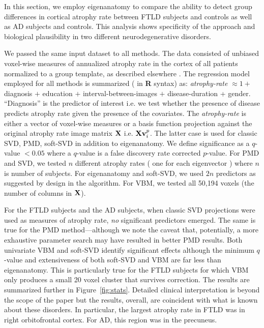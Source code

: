 \documentclass{llncs}
\newcommand{\X}{{\bf X}}
\newcommand{\vv}{{\bf v}}
\begin{document}
  In this section, we employ eigenanatomy to compare the ability to detect group differences in cortical atrophy rate between FTLD subjects and controls as well as AD subjects and controls.  This analysis shows specificity of the approach and biological plausibility in two different neurodegenerative disorders.  

We passed the same input dataset to all methods.  The data consisted of unbiased voxel-wise measures of annualized atrophy rate in the cortex of all patients normalized to a group template, as described elsewhere \cite{anon}.  The regression model employed for all methods is summarized ( in {\bf R} syntax) as: {\em atrophy-rate} $\approx 1 +$ diagnosis $+$ education $+$ interval-between-images $+$ disease-duration + gender.  ``Diagnosis'' is the predictor of interest i.e. we test whether the presence of disease predicts atrophy rate given the presence of the covariates.  The {\em atrophy-rate} is either a vector of voxel-wise measures or a basis function projection against the original atrophy rate image matrix $\X$ i.e. $\X \vv_i^p$.   The latter case is used for classic SVD, PMD, soft-SVD in addition to eigenanatomy.  We define significance as a $q$-value $< 0.05$ where a $q$-value is a false discovery rate corrected $p$-value.  For PMD and SVD, we tested $n$ different atrophy rates ( one for each eigenvector ) where $n$ is number of subjects.  For eigenanatomy and soft-SVD, we used $2n$ predictors as suggested by design in the algorithm.  For VBM, we tested all 50,194 voxels (the number of columns in $\X$).

For the FTLD subjects and the AD subjects, when classic SVD projections were used as measures of atrophy rate, {\em no} significant predictors emerged.  The same is true for the PMD method---although we note the caveat that, potentially, a more exhaustive parameter search may have resulted in better PMD results.  Both univariate VBM and soft-SVD identify significant effects although the minimum $q$-value and extensiveness of both soft-SVD and VBM are far less than eigenanatomy.  This is particularly true for the FTLD subjects for which VBM only produces a small 20 voxel cluster that survives correction.  The results are summarized further in Figure~\ref{fig:stats}.  Detailed clinical interpretation is beyond the scope of the paper but the results, overall, are coincident with what is known about these disorders.  In particular, the largest atrophy rate in FTLD was in right orbitofrontal cortex.  For AD, this region was in the precuneus.  
\newline
\end{document}
